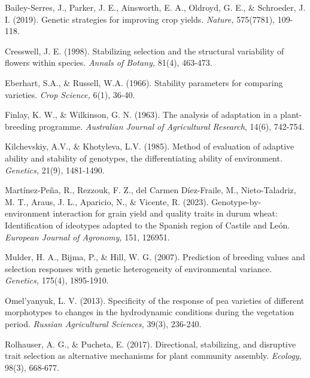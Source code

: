 \documentclass[
]{article}
\begin{document}
Bailey-Serres, J., Parker, J. E., Ainsworth, E. A., Oldroyd, G. E., \&
Schroeder, J. I. (2019). Genetic strategies for improving crop yields.
\emph{Nature,} 575(7781), 109-118.

Cresswell, J. E. (1998). Stabilizing selection and the structural
variability of flowers within species. \emph{Annals of Botany,} 81(4),
463-473.

Eberhart, S.A., \& Russell, W.A. (1966). Stability parameters for
comparing varieties. \emph{Crop Science,} 6(1), 36-40.

Finlay, K. W., \& Wilkinson, G. N. (1963). The analysis of adaptation in
a plant-breeding programme. \emph{Australian Journal of Agricultural
Research}, 14(6), 742-754.

Kilchevskiy, A.V., \& Khotyleva, L.V. (1985). Method of evaluation of
adaptive ability and stability of genotypes, the differentiating ability
of environment. \emph{Genetics,} 21(9), 1481-1490.

Martínez-Peña, R., Rezzouk, F. Z., del Carmen Díez-Fraile, M.,
Nieto-Taladriz, M. T., Araus, J. L., Aparicio, N., \& Vicente, R.
(2023). Genotype-by-environment interaction for grain yield and quality
traits in durum wheat: Identification of ideotypes adapted to the
Spanish region of Castile and León. \emph{European Journal of Agronomy,}
151, 126951.

Mulder, H. A., Bijma, P., \& Hill, W. G. (2007). Prediction of breeding
values and selection responses with genetic heterogeneity of
environmental variance. \emph{Genetics,} 175(4), 1895-1910.

Omel'yanyuk, L. V. (2013). Specificity of the response of pea varieties
of different morphotypes to changes in the hydrodynamic conditions
during the vegetation period. \emph{Russian Agricultural Sciences,}
39(3), 236-240.

Rolhauser, A. G., \& Pucheta, E. (2017). Directional, stabilizing, and
disruptive trait selection as alternative mechanisms for plant community
assembly. \emph{Ecology,} 98(3), 668-677.
\end{document}
